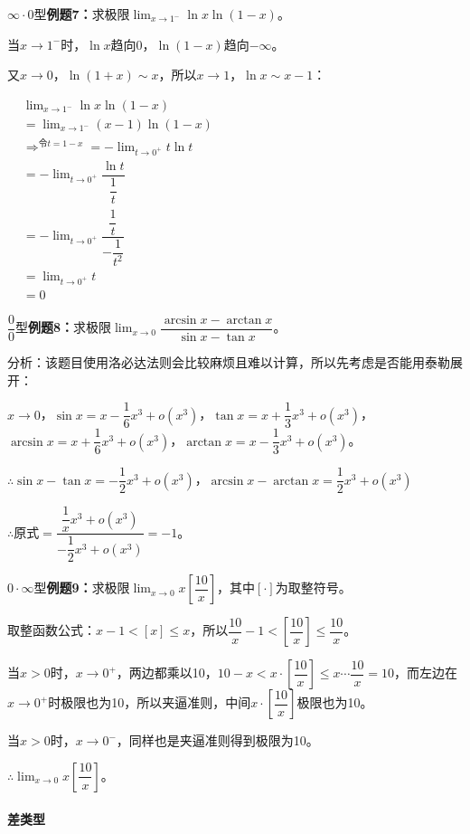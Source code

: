 \documentclass[UTF8]{ctexart}
\begin{document}
$\infty\cdot 0$型\textbf{例题7：}求极限$\lim_{x\to 1^-}\ln x\ln(1-x)$。

当$x\to 1^-$时，$\ln x$趋向0，$\ln(1-x)$趋向$-\infty$。

又$x\to 0$，$\ln(1+x)\sim x$，所以$x\to 1$，$\ln x\sim x-1$：

$
\begin{aligned}
    & \lim_{x\to 1^-}\ln x\ln(1-x) \\
    & = \lim_{x\to 1^-}(x-1)\ln(1-x) \\
    & \Rightarrow^{令t=1-x} =-\lim_{t\to 0^+}t\ln t \\
    & = -\lim_{t\to 0^+}\dfrac{\ln t}{\dfrac{1}{t}} \\
    & = -\lim_{t\to 0^+}\dfrac{\dfrac{1}{t}}{-\dfrac{1}{t^2}} \\
    & = \lim_{t\to 0^+}t \\
    & = 0
\end{aligned}
$


$\dfrac{0}{0}$型\textbf{例题8：}求极限$\lim_{x\to 0}\dfrac{\arcsin x-\arctan x}{\sin x-\tan x}$。

分析：该题目使用洛必达法则会比较麻烦且难以计算，所以先考虑是否能用泰勒展开：

$x\to 0$，$\sin x=x-\dfrac{1}{6}x^3+o(x^3)$，$\tan x=x+\dfrac{1}{3}x^3+o(x^3)$，$\arcsin x=x+\dfrac{1}{6}x^3+o(x^3)$，$\arctan x=x-\dfrac{1}{3}x^3+o(x^3)$。

$\therefore \sin x-\tan x=-\dfrac{1}{2}x^3+o(x^3)$，$\arcsin x-\arctan x=\dfrac{1}{2}x^3+o(x^3)$

$\therefore \text{原式}=\dfrac{\dfrac{1}{x}x^3+o(x^3)}{-\dfrac{1}{2}x^3+o(x^3)}=-1$。

$0\cdot\infty$型\textbf{例题9：}求极限$\lim_{x\to 0}x\left[\dfrac{10}{x}\right]$，其中$[\cdot]$为取整符号。

取整函数公式：$x-1<[x]\leqslant x$，所以$\dfrac{10}{x}-1<\left[\dfrac{10}{x}\right]\leqslant\dfrac{10}{x}$。

当$x>0$时，$x\to 0^+$，两边都乘以10，$10-x<x\cdot\left[\dfrac{10}{x}\right]\leqslant x\cdots\dfrac{10}{x}=10$，而左边在$x\to 0^+$时极限也为10，所以夹逼准则，中间$x\cdot\left[\dfrac{10}{x}\right]$极限也为10。

当$x>0$时，$x\to 0^-$，同样也是夹逼准则得到极限为10。

$\therefore \lim_{x\to 0}x\left[\dfrac{10}{x}\right]$。

\paragraph{差类型} \leavevmode \bigskip
\end{document}
